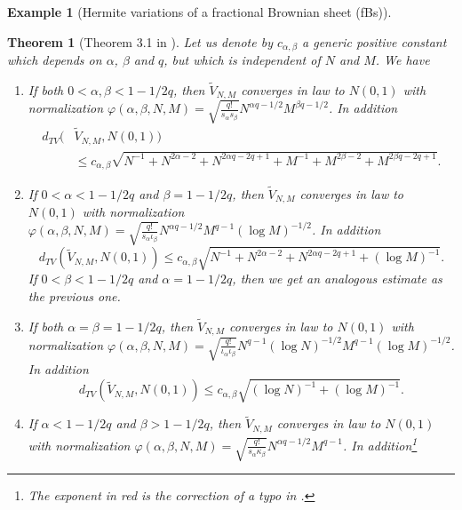 \documentclass[12pt]{article}
\DeclareMathOperator{\1}{1}
\renewcommand{\phi}{\varphi}
\theoremstyle{plain}
\newtheorem{theorem}{Theorem}
\theoremstyle{definition}
\newtheorem{example}{Example}
\begin{document}
\begin{example}[Hermite variations of a fractional Brownian sheet (fBs)]
    \begin{theorem}[Theorem 3.1 in \cite{RST}]
    Let us denote by $c_{\alpha,\beta}$ a generic positive constant which depends on $\alpha$, $\beta$ and $q$, but which is independent of $N$ and $M$. We have \begin{enumerate}[label=(\arabic*)]
                \item If both $0<\alpha,\beta<1-1/2q$, then $\widetilde V_{N,M}$ converges in law to $N(0,1)$ with normalization $\phi(\alpha,\beta,N,M)=\sqrt{\frac{q!}{s_{\alpha}s_{\beta}}} N^{\alpha q - 1/2} M^{\beta q - 1/2}$. In addition \begin{equation}\begin{aligned}
                    d_{TV}(&\widetilde V_{N,M},N(0,1)) \\
                    &\le c_{\alpha,\beta}\sqrt{N^{-1} + N^{2\alpha-2}+N^{2\alpha q -2q +1}+M^{-1} + M^{2\beta-2}+M^{2\beta q -2q +1}}.
                    \end{aligned}
                \end{equation}
                \item If $0<\alpha<1-1/2q$ and $\beta=1-1/2q$, then $\widetilde V_{N,M}$ converges in law to $N(0,1)$ with normalization $\phi(\alpha,\beta,N,M)=\sqrt{\frac{q!}{s_{\alpha}\iota_{\beta}}} N^{\alpha q - 1/2} M^{q-1}(\log M)^{-1/2}$. In addition \begin{equation}
                    d_{TV}(\widetilde V_{N,M},N(0,1))\le c_{\alpha,\beta}\sqrt{N^{-1} + N^{2\alpha-2}+N^{2\alpha q -2q +1}+(\log M)^{-1}}.
                \end{equation}
                If $0<\beta<1-1/2q$ and $\alpha=1-1/2q$, then we get an analogous estimate as the previous one.
                \item If both $\alpha=\beta=1-1/2q$, then $\widetilde V_{N,M}$ converges in law to $N(0,1)$ with normalization $\phi(\alpha,\beta,N,M)=\sqrt{\frac{q!}{\iota_{\alpha}\iota_{\beta}}} N^{q-1}(\log N)^{-1/2} M^{q-1}(\log M)^{-1/2}$. In addition \begin{equation}
                    d_{TV}(\widetilde V_{N,M},N(0,1)) \le c_{\alpha,\beta}\sqrt{(\log N)^{-1}+(\log M)^{-1}}.
                \end{equation} 
                \item If $\alpha<1-1/2q$ and $\beta>1-1/2q$, then $\widetilde V_{N,M}$ converges in law to $N(0,1)$ with normalization $\phi(\alpha,\beta,N,M)=\sqrt{\frac{q!}{s_{\alpha}\kappa_{\beta}}} N^{\alpha q - 1/2} M^{ q - 1}$. In addition\footnote{The exponent in red is the correction of a typo in \cite[Theorem 3.1]{RST}.} \begin{equation}

\end{equation}
\end{enumerate}
\end{theorem}
\end{example}
\end{document}
